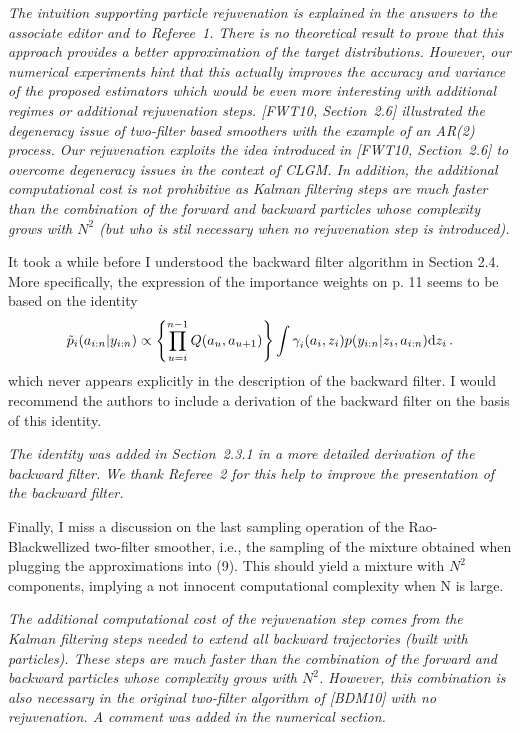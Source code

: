 \vspace{.2cm}
{\em
\noindent The intuition supporting particle rejuvenation is explained in the answers to the associate editor and to Referee~1. There is no theoretical result to prove that this approach provides a better approximation of the target distributions. However, our numerical experiments hint that this actually improves the accuracy and variance of the proposed estimators which would be even more interesting with additional regimes or additional rejuvenation steps. 
[FWT10, Section~2.6] illustrated the degeneracy issue of two-filter based smoothers with the example of an AR(2) process. Our rejuvenation exploits the idea introduced in [FWT10, Section~2.6] to overcome degeneracy issues in the context of CLGM. In addition, the additional computational cost is not prohibitive as Kalman filtering steps are much faster than the combination of the forward and backward particles whose complexity grows with $N^2$ (but who is stil necessary when no rejuvenation step is introduced).
}

\vspace{.5cm}

\noindent It took a while before I understood the backward filter algorithm in Section 2.4. More
specifically, the expression of the importance weights on p. 11 seems to be based on
the identity
\[
\tilde{p}_{i}(a_{i:n}|y_{i:n}) \propto \left\{\prod_{u=i}^{n-1}Q(a_u,a_{u+1})\right\} \int \gamma^{}_{i}(a_i,z_i) p(y_{i:n}|z_i,a_{i:n})\mathrm{d} z_i\,.
\]
which never appears explicitly in the description of the backward  filter. I would recommend
the authors to include a derivation of the backward filter on the basis of this identity.

\vspace{.2cm}
{\em
\noindent The identity was added in Section~2.3.1 in a more detailed derivation of the backward filter. We thank Referee~2 for this help to improve the presentation of the backward filter.
}

\vspace{.5cm}

\noindent Finally, I miss a discussion on the last sampling operation of the Rao-Blackwellized
two-filter smoother, i.e., the sampling of the mixture obtained when plugging the approximations into (9). This should yield a mixture with $N^2$ components, implying a not innocent computational complexity when N is large.

\vspace{.2cm}
{\em
\noindent The additional computational cost of the rejuvenation step comes from the Kalman filtering steps needed to extend all backward trajectories (built with particles). These steps are much faster than the combination of the forward and backward particles whose complexity grows with $N^2$. However, this combination is also necessary in the original two-filter algorithm of [BDM10] with no rejuvenation. A comment was added in the numerical section.
}

\vspace{.5cm}

